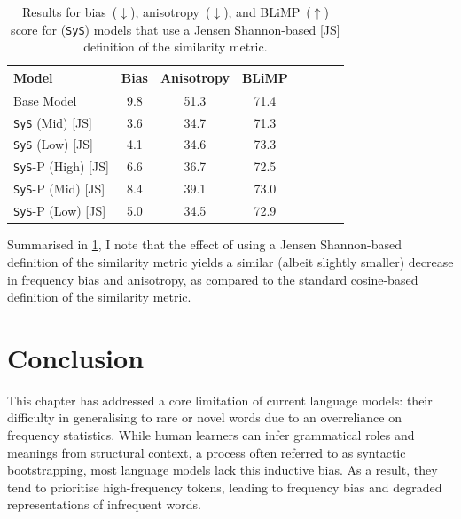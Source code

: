 \begin{table}[ht!]
\centering
\small
\begin{tabular}{l||cc|ccccc}
\toprule
\textbf{Model}  &  \textbf{Bias}  & \textbf{Anisotropy} & \textbf{BLiMP} \\
\midrule
Base Model & 9.8 & 51.3 & 71.4  \\
\midrule
\texttt{SyS} (Mid) \hspace{0.42cm} [JS]  & 3.6 & 34.7 & 71.3 \\
\texttt{SyS} (Low) \hspace{0.38cm} [JS]  & 4.1 & 34.6 & 73.3  \\
\texttt{SyS}-P (High) \hspace{0.05cm} [JS] & 6.6 & 36.7  & 72.5  \\ 
\texttt{SyS}-P (Mid) \hspace{0.15cm} [JS] & 8.4 & 39.1 &  73.0 \\ 
\texttt{SyS}-P (Low) \hspace{0.12cm} [JS] & 5.0 &  34.5 & 72.9 \\ 
\bottomrule
\end{tabular}
\caption{\label{tbl:jsd-similarity-metric-results}
Results for bias~($\downarrow$), anisotropy~($\downarrow$), and BLiMP~($\uparrow$) score for \smoothing (\texttt{SyS}) models that use a Jensen Shannon-based [JS] definition of the similarity metric.}
\end{table}

Summarised in \cref{tbl:jsd-similarity-metric-results}, I note that the effect of using a Jensen Shannon-based definition of the similarity metric yields a similar (albeit slightly smaller) decrease in frequency bias and anisotropy, as compared to the standard cosine-based definition of the similarity metric.   

\section{Conclusion}
\label{sec:anisotropy-conclusion}

This chapter has addressed a core limitation of current language models: their difficulty in generalising to rare or novel words due to an overreliance on frequency statistics. While human learners can infer grammatical roles and meanings from structural context, a process often referred to as syntactic bootstrapping, most language models lack this inductive bias. As a result, they tend to prioritise high-frequency tokens, leading to frequency bias and degraded representations of infrequent words.

